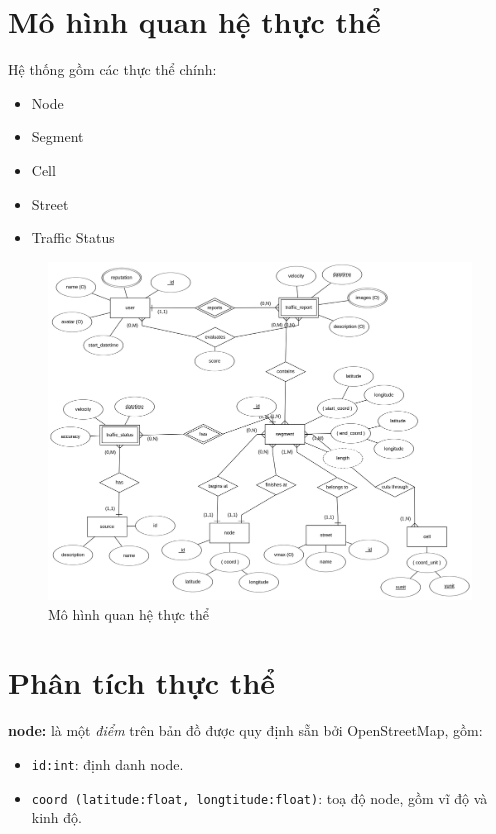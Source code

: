 \section{Mô hình quan hệ thực thể}
Hệ thống gồm các thực thể chính:
\begin{itemize}
    \item Node
    \item Segment
    \item Cell
    \item Street
    \item Traffic Status
\end{itemize}
\begin{figure}[H]
\centering
\includegraphics[width=1.0\textwidth]{Traffic_Report/images/erd.png}
\caption{Mô hình quan hệ thực thể}\label{}
\end{figure}

\section{Phân tích thực thể}
\textbf{node:} là một \textit{điểm} trên bản đồ được quy định sẵn bởi OpenStreetMap, gồm:
\begin{itemize}
    \item \lstinline{id:int}: định danh node.
    \item \lstinline{coord (latitude:float, longtitude:float)}: toạ độ node, gồm vĩ độ và kinh độ.\\
\end{itemize}

